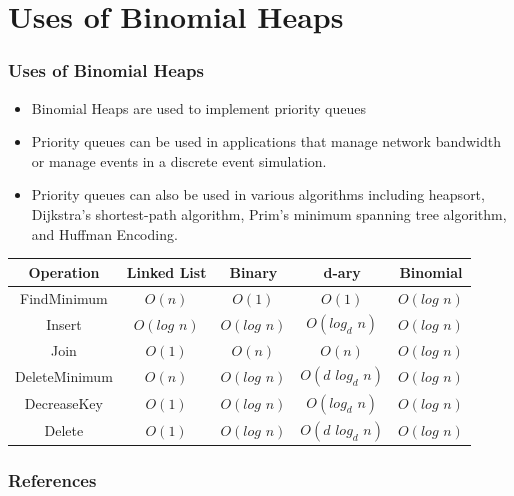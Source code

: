\documentclass[13pt]{beamer}
\begin{document}
\section{Uses of Binomial Heaps} %
\begin{frame}
\frametitle{Uses of Binomial Heaps}
  \begin{itemize}
    \item Binomial Heaps are used to implement priority queues
    \item Priority queues can be used in applications that manage network bandwidth or manage events in a discrete event simulation.
    \item Priority queues can also be used in various algorithms including heapsort, Dijkstra's shortest-path algorithm, Prim's minimum spanning tree algorithm, and Huffman Encoding.
  \end{itemize}

  \begin{center}
    \begin{tabular}{ | c || c | c | c | c | }
      \hline
      Operation & Linked List & Binary & d-ary & Binomial \\ \hline
      FindMinimum & $O(n)$ & $O(1)$ & $O(1)$ & $O(\textit{log n})$ \\ \hline
      Insert & $O(\textit{log n})$ & $O(\textit{log n})$ & $O(log_d \textit{ n})$ & $O(\textit{log n})$ \\ \hline
      Join & $O(1)$ & $O(n)$ & $O(n)$ & $O(\textit{log n})$ \\ \hline
      DeleteMinimum & $O(n)$ & $O(\textit{log n})$ & $O(\textit{d }log_d \textit{ n})$ & $O(\textit{log n})$ \\ \hline
      DecreaseKey & $O(1)$ & $O(\textit{log n})$ & $O(log_d \textit{ n})$ & $O(\textit{log n})$ \\ \hline
      Delete & $O(1)$ & $O(\textit{log n})$ & $O(\textit{d }log_d \textit{ n})$ & $O(\textit{log n})$ \\ \hline
      \hline
    \end{tabular}
\end{center}
\end{frame}

 \begin{frame}
  \frametitle{References}
  \nocite{*} 
  
\end{frame}
\end{document}
